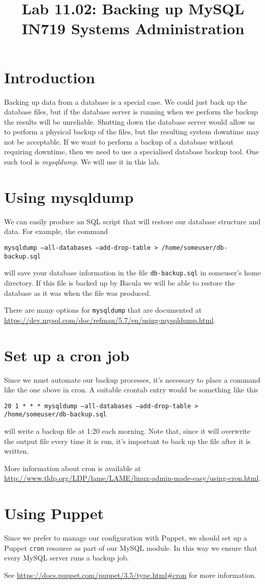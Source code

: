 \documentclass{article}   	%
\title{Lab 11.02:  Backing up MySQL\\ IN719 Systems Administration}
\date{}							%
\begin{document}
\maketitle

\section*{Introduction}
Backing up data from a database is a special case.  We could just back up the database files, but if the database server is running when we perform the backup the results will be unreliable. Shutting down the database server would allow us to perform a physical backup of the files, but the resulting system downtime may not be acceptable.  If we want to perform a backup of a database without requiring downtime, then we need to use a specialised database backup tool.  One such tool is \emph{mysqldump}.  We will use it in this lab.

\section{Using mysqldump}
We can easily produce an SQL script that will restore our database structure and data.  For example, the command

\texttt {mysqldump --all-databases --add-drop-table > /home/someuser/db-backup.sql}

will save your database information in the file \texttt{db-backup.sql} in someuser's home directory.  If this file is backed up by Bacula we will be able to restore the database as it was when the file was produced.

There are many options for \texttt{mysqldump} that are documented at \url{https://dev.mysql.com/doc/refman/5.7/en/using-mysqldump.html}.

\section{Set up a cron job}
Since we must automate our backup processes, it's necessary to place a command like the one above in cron.  A suitable crontab entry would be something like this

\texttt{20 1 * * *    mysqldump --all-databases --add-drop-table > /home/someuser/db-backup.sql}

will write a backup file at 1:20 each morning.  Note that, since it will overwrite the output file every time it is run, it's important to back up the file after it is written.

More information about cron is available at \url{http://www.tldp.org/LDP/lame/LAME/linux-admin-made-easy/using-cron.html}.

\section{Using Puppet}
Since we prefer to manage our configuration with Puppet, we should set up a Puppet \texttt{cron} resource as part of our MySQL module.  In this way we ensure that every MySQL server runs a backup job.

See \url{https://docs.puppet.com/puppet/3.5/type.html#cron} for more information.
\end{document}
